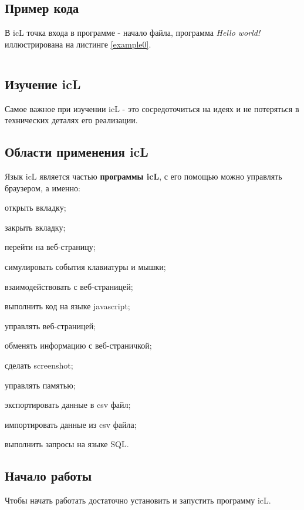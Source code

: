 \subsection{Пример кода}

В icL точка входа в программе - начало файла, программа \textit{Hello world!} иллюстрирована на листинге \ref{example0}.

\begin{sourcecode}
	\label{example0}
    \inputminted[linenos]{icl}{../sources/helloworld.icL}
\end{sourcecode}

\subsection{Изучение icL}

Самое важное при изучении icL - это сосредоточиться на идеях и не потеряться в технических деталях его реализации.

\subsection{Области применения icL}

Язык icL является частью \textbf{программы icL}, с его помощью можно управлять браузером, а именно:
\begin{icItems}
\item
	открыть вкладку;
\item
	закрыть вкладку;
\item
	перейти на веб-страницу;
\item
	симулировать события клавиатуры и мышки;
\item
	взаимодействовать с веб-страницей;
\item
	выполнить код на языке javascript;
\item
	управлять веб-страницей;
\item
	обменять информацию с веб-страничкой;
\item
	сделать screenshot;
\item
	управлять памятью;
\item
	экспортировать данные в csv файл;
\item
	импортировать данные из csv файла;
\item
	выполнить запросы на языке SQL.
\end{icItems}

\subsection{Начало работы}

Чтобы начать работать достаточно установить и запустить программу icL.

